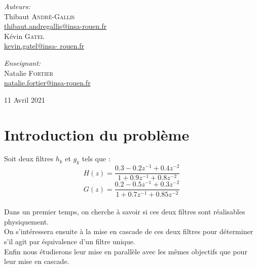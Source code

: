 \documentclass[12,french]{report}
\begin{document}
\begin{titlepage}
\begin{center}
	\begin{minipage}{0.4\textwidth}
		\begin{flushleft} \large
			\emph{Auteurs:}\\
			Thibaut \textsc{André-Gallis} \\
			{\small\href{mailto:thibaut.andregallis@insa-rouen.fr}{thibaut.andregallis@insa-rouen.fr}} \\
			Kévin \textsc{Gatel} \\
			{\small\href{mailto:kevin.gatel@insa-rouen.fr}{kevin.gatel@insa-				rouen.fr}}
		\end{flushleft}
	\end{minipage}
	\begin{minipage}{0.4\textwidth}
		\begin{flushright} \large
			\emph{Enseignant:} \\
			Natalie \textsc{Fortier} \\
			{\small\href{mailto:natalie.fortier@insa-rouen.fr}								{natalie.fortier@insa-rouen.fr}}
		\end{flushright}
	\end{minipage}

	\vfill
	{\large 11 Avril 2021}
\end{center}
\end{titlepage}

\tableofcontents


\renewcommand{\chaptername}{}
\chapter*{Introduction du problème}

Soit deux filtres $h_k$ et $g_k$ tels que :\\

$$ H(z) = \frac{0.3-0.2z^{-1}+0.4z^{-2}}{1+0.9z^{-1}+0.8z^{-2}} $$
$$ G(z) = \frac{0.2-0.5z^{-1}+0.3z^{-2}}{1+0.7z^{-1}+0.85z^{-2}} $$ \\

Dans un premier temps, on cherche à savoir si ces deux filtres sont réalisables physiquement.\\

On s’intéressera ensuite à la mise en cascade de ces deux filtres pour déterminer s'il agit par équivalence d'un filtre unique.\\

Enfin nous étudierons leur mise en parallèle avec les mêmes objectifs que pour leur mise en cascade.
\end{document}
